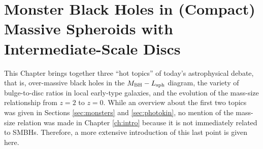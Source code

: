 \chapter{Monster Black Holes in (Compact) Massive Spheroids with Intermediate-Scale Discs}
\label{ch:ellic}

This Chapter brings together three ``hot topics'' of today's astrophysical debate, 
that is, over-massive black holes in the $M_{\rm BH} - L_{\rm sph}$ diagram, 
the variety of bulge-to-disc ratios in local early-type galaxies, 
and the evolution of the mass-size relationship from $z=2$ to $z=0$. 
While an overview about the first two topics was given in Sections \ref{sec:monsters} and \ref{sec:photokin}, 
no mention of the mass-size relation was made in Chapter \ref{ch:intro} 
because it is not immediately related to SMBHs. 
Therefore, a more extensive introduction of this last point is given here. \\ 

